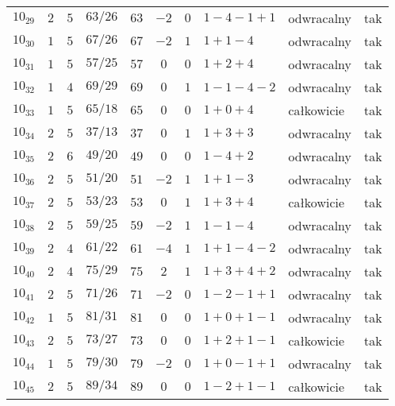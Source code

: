 \begin{longtable}{lccccccllc}
$10_{29}$   &  $2$     &  $5$  &  $63/26$  &  $63$   &  $-2$  &  $0$  &  $1-4-1+1$      &  odwracalny  &  tak  \\
$10_{30}$   &  $1$     &  $5$  &  $67/26$  &  $67$   &  $-2$  &  $1$  &  $1+1-4$        &  odwracalny  &  tak  \\
$10_{31}$   &  $1$     &  $5$  &  $57/25$  &  $57$   &  $0$   &  $0$  &  $1+2+4$        &  odwracalny  &  tak  \\
$10_{32}$   &  $1$     &  $4$  &  $69/29$  &  $69$   &  $0$   &  $1$  &  $1-1-4-2$      &  odwracalny  &  tak  \\
$10_{33}$   &  $1$     &  $5$  &  $65/18$  &  $65$   &  $0$   &  $0$  &  $1+0+4$        &  całkowicie  &  tak  \\
$10_{34}$   &  $2$     &  $5$  &  $37/13$  &  $37$   &  $0$   &  $1$  &  $1+3+3$        &  odwracalny  &  tak  \\
$10_{35}$   &  $2$     &  $6$  &  $49/20$  &  $49$   &  $0$   &  $0$  &  $1-4+2$        &  odwracalny  &  tak  \\
$10_{36}$   &  $2$     &  $5$  &  $51/20$  &  $51$   &  $-2$  &  $1$  &  $1+1-3$        &  odwracalny  &  tak  \\
$10_{37}$   &  $2$     &  $5$  &  $53/23$  &  $53$   &  $0$   &  $1$  &  $1+3+4$        &  całkowicie  &  tak  \\
$10_{38}$   &  $2$     &  $5$  &  $59/25$  &  $59$   &  $-2$  &  $1$  &  $1-1-4$        &  odwracalny  &  tak  \\
$10_{39}$   &  $2$     &  $4$  &  $61/22$  &  $61$   &  $-4$  &  $1$  &  $1+1-4-2$      &  odwracalny  &  tak  \\
$10_{40}$   &  $2$     &  $4$  &  $75/29$  &  $75$   &  $2$   &  $1$  &  $1+3+4+2$      &  odwracalny  &  tak  \\
$10_{41}$   &  $2$     &  $5$  &  $71/26$  &  $71$   &  $-2$  &  $0$  &  $1-2-1+1$      &  odwracalny  &  tak  \\
$10_{42}$   &  $1$     &  $5$  &  $81/31$  &  $81$   &  $0$   &  $0$  &  $1+0+1-1$      &  odwracalny  &  tak  \\
$10_{43}$   &  $2$     &  $5$  &  $73/27$  &  $73$   &  $0$   &  $0$  &  $1+2+1-1$      &  całkowicie  &  tak  \\
$10_{44}$   &  $1$     &  $5$  &  $79/30$  &  $79$   &  $-2$  &  $0$  &  $1+0-1+1$      &  odwracalny  &  tak  \\
$10_{45}$   &  $2$     &  $5$  &  $89/34$  &  $89$   &  $0$   &  $0$  &  $1-2+1-1$      &  całkowicie  &  tak  \\

\end{longtable}

